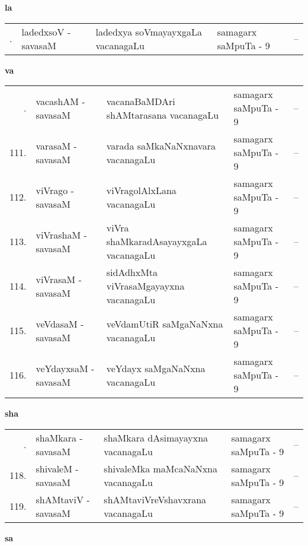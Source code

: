 \medskip

\centerline{\bf la}

{\renewcommand{\arraystretch}{1.3}
\begin{longtable}{rl>{\raggedright}p{5.5cm}lc}
\hline
\endfirsthead
\hline
\endhead
\hline
\endfoot
\endlastfoot
109. &  ladedxsoV - savasaM &  ladedxya soVmayayxgaLa vacanagaLu & samagarx saMpuTa - 9 & --
\end{longtable}}

\medskip

\centerline{\bf va}

{\renewcommand{\arraystretch}{1.3}
\begin{longtable}{rl>{\raggedright}p{5.5cm}lc}
\hline
\endfirsthead
\hline
\endhead
\hline
\endfoot
\endlastfoot
110. &  vacashAM - savasaM & vacanaBaMDAri shAMtarasana vacanagaLu & samagarx saMpuTa - 9 & --\\
111. &  varasaM - savasaM &  varada saMkaNaNxnavara vacanagaLu & samagarx saMpuTa - 9 & --\\
112. &  viVrago - savasaM &  viVragolAlxLana vacanagaLu & samagarx saMpuTa - 9 & --\\
113. & viVrashaM - savasaM &  viVra shaMkaradAsayayxgaLa vacanagaLu & samagarx saMpuTa - 9 & --\\
114. & viVrasaM - savasaM & sidAdhxMta viVrasaMgayayxna vacanagaLu & samagarx saMpuTa - 9 & --\\
115. & veVdasaM - savasaM &  veVdamUtiR saMgaNaNxna vacanagaLu & samagarx saMpuTa - 9 & --\\
116. & veYdayxsaM - savasaM &  veYdayx saMgaNaNxna vacanagaLu & samagarx saMpuTa - 9 & --
\end{longtable}}

\medskip

\centerline{\bf sha}

{\renewcommand{\arraystretch}{1.3}
\begin{longtable}{rl>{\raggedright}p{5.5cm}lc}
\hline
\endfirsthead
\hline
\endhead
\hline
\endfoot
\endlastfoot
117. & shaMkara - savasaM &  shaMkara dAsimayayxna vacanagaLu & samagarx saMpuTa - 9 & --\\
118. & shivaleM - savasaM &  shivaleMka maMcaNaNxna vacanagaLu & samagarx saMpuTa - 9 & --\\
119. & shAMtaviV - savasaM & shAMtaviVreVshavxrana vacanagaLu & samagarx saMpuTa - 9 & --
\end{longtable}}
\medskip

\centerline{\bf sa}

